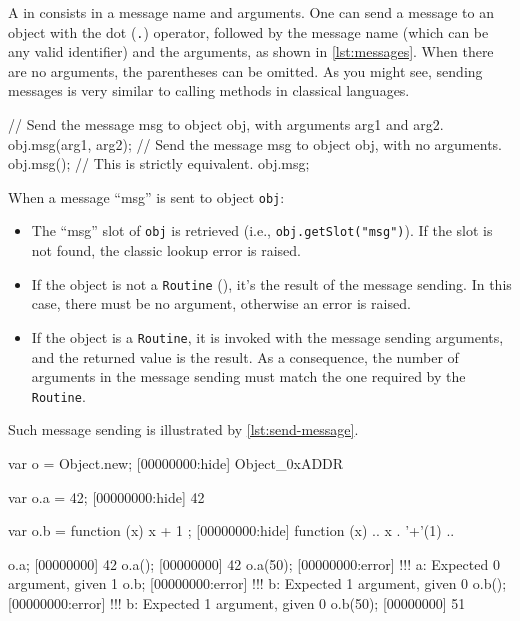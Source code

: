 A  in \us consists in a message name and arguments. One can
send a message to an object with the dot (\lstinline|.|) operator,
followed by the message name (which can be any valid identifier) and
the arguments, as shown in \autoref{lst:messages}. When there are no
arguments, the parentheses can be omitted. As you might see,
sending messages is very similar to calling methods in classical
languages.

\begin{urbiscript}[caption=Sending messages, label=lst:messages,
  float=\floatpos]
// Send the message msg to object obj, with arguments arg1 and arg2.
obj.msg(arg1, arg2);
// Send the message msg to object obj, with no arguments.
obj.msg();
// This is strictly equivalent.
obj.msg;
\end{urbiscript}

When a message ``msg'' is sent to object \lstinline|obj|:

\begin{itemize}
\item The ``msg'' slot of \lstinline|obj| is retrieved (i.e.,
  \lstinline|obj.getSlot("msg")|). If the slot is not found, the
  classic lookup error is raised.
\item If the object is not a \lstinline|Routine|
  (), it's
  the result of the message sending. In this case, there must be no
  argument, otherwise an error is raised.
\item If the object is a \lstinline|Routine|, it is invoked with the
  message sending arguments, and the returned value is the result. As
  a consequence, the number of arguments in the message sending must
  match the one required by the \lstinline|Routine|.
\end{itemize}

Such message sending is illustrated by \autoref{lst:send-message}.

\begin{urbiscript}[caption=Sending messages, label=lst:send-message,
  float=\floatpos]
var o = Object.new;
[00000000:hide] Object_0xADDR

var o.a = 42;
[00000000:hide] 42

var o.b = function (x) { x + 1 };
[00000000:hide] function (x) {
..  x . '+'(1)
..}

o.a;
[00000000] 42
o.a();
[00000000] 42
o.a(50);
[00000000:error] !!! a: Expected 0 argument, given 1
o.b;
[00000000:error] !!! b: Expected 1 argument, given 0
o.b();
[00000000:error] !!! b: Expected 1 argument, given 0
o.b(50);
[00000000] 51
\end{urbiscript}

